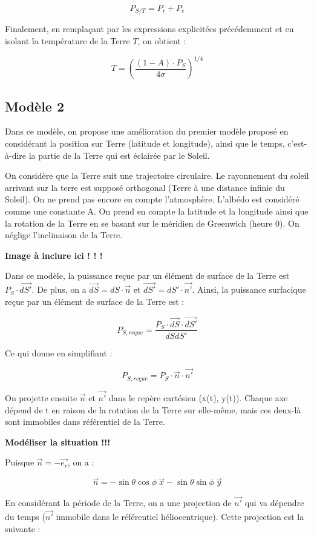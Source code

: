 \documentclass[a4paper,11pt]{article}
\begin{document}
\[ P_{S/T} = P_r + P_e \]

Finalement, en remplaçant par les expressions explicitées précédemment et en isolant la température de la Terre $T$, on obtient :

\[ T = \left(\dfrac{(1 - A) \cdot P_S}{4\sigma}\right)^{1/4} \]

\subsection{Modèle 2}

Dans ce modèle, on propose une amélioration du premier modèle proposé en considérant la position sur Terre (latitude et longitude), ainsi que le temps, c'est-à-dire la partie de la Terre qui est éclairée par le Soleil.

On considère que la Terre suit une trajectoire circulaire. Le rayonnement du soleil arrivant sur la terre est supposé orthogonal (Terre à une distance infinie du Soleil). On ne prend pas encore en compte l’atmosphère. L’albédo est considéré comme une constante A. On prend en compte la latitude et la longitude ainsi que la rotation de la Terre en se basant sur le méridien de Greenwich (heure 0). On néglige l'inclinaison de la Terre.

\textbf{Image à inclure ici ! ! !
}

Dans ce modèle, la puissance reçue par un élément de surface de la Terre est $P_S \cdot \overrightarrow{dS'}$. De plus, on a $\overrightarrow{dS} = dS \cdot \vec{n}$ et $\overrightarrow{dS'} = dS' \cdot \vec{n'}$. Ainsi, la puissance surfacique reçue par un élément de surface de la Terre est :

\[ P_{S, reçue} = \dfrac{P_S \cdot \overrightarrow{dS} \cdot \overrightarrow{dS'}}{dSdS'} \]

Ce qui donne en simplifiant :

\[ P_{S,reçue} = P_S \cdot \vec{n} \cdot \vec{n'} \]

On projette ensuite $\vec{n}$ et $\vec{n'}$ dans le repère cartésien (x(t), y(t)). Chaque axe dépend de t en raison de la rotation de la Terre sur elle-même, mais ces deux-là sont immobiles dans référentiel de la Terre.

\textbf{Modéliser la situation !!!}

Puisque $ \vec{n} = -\overrightarrow{e_r}$, on a :

\[ \vec{n} = - \sin \theta \cos \phi ~ \vec{x} - \sin \theta \sin \phi ~ \vec{y} \]

En considérant la période de la Terre, on a une projection de $\vec{n'}$ qui va dépendre du temps ($\vec{n'}$ immobile dans le référentiel héliocentrique). Cette projection est la suivante :
\end{document}
